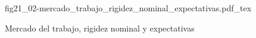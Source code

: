 \begin{figure}[h]
\centering
\def\svgwidth{0.5\textwidth}
{fig21_02-mercado_trabajo_rigidez_nominal_expectativas.pdf_tex}
\caption{Mercado del trabajo, rigidez nominal y expectativas}
\label{fig21_02-mercado_trabajo_rigidez_nominal_expectativas}
\end{figure}
